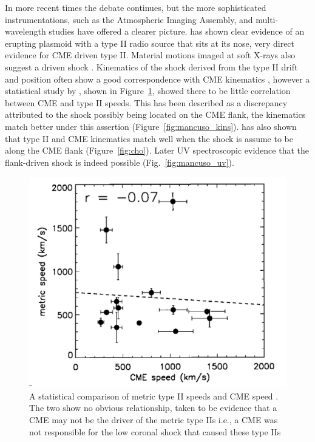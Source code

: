In more recent times the debate continues, but the more sophisticated instrumentations, such as the Atmospheric Imaging Assembly, and multi-wavelength studies have offered a clearer picture. \citet{bain2012} has shown clear evidence of an erupting plasmoid with a type II radio source that sits at its nose, very direct evidence for CME driven type II. Material motions imaged at soft X-rays also suggest a driven shock \citep{klein1999}. Kinematics of the shock derived from the type II drift and position often show a good correspondence with CME kinematics \citep{mancuso2011}, however a statistical study by \citet{reiner2001}, shown in Figure~\ref{fig:reiner}, showed there to be little correlation between CME and type II speeds. This has been described as a discrepancy attributed to the shock possibly being located on the CME flank, the kinematics match better under this assertion \citep{mancuso2004} (Figure~\ref{fig:mancuso_kins}). \citep{cho2007, cho2012} has also shown that type II and CME kinematics match well when the shock is assume to be along the CME flank (Figure~\ref{fig:cho}). Later UV spectroscopic evidence that the flank-driven shock is indeed possible (Fig.~\ref{fig:mancuso_uv}). 

\begin{figure}[t!]
\begin{center}
\includegraphics[trim=2cm 0cm 0cm 0cm, scale=0.3]{images/reiner2001.pdf}
\caption[Statistical comparison of CME and type II height-time kinematics]{A statistical comparison of metric type II speeds and CME speed \citet{reiner2001}. The two show no obvious relationship, taken to be evidence that a CME may not be the driver of the metric type IIs i.e., a CME was not responsible for the low coronal shock that caused these type IIs}
\label{fig:reiner}
\end{center}
\end{figure}

